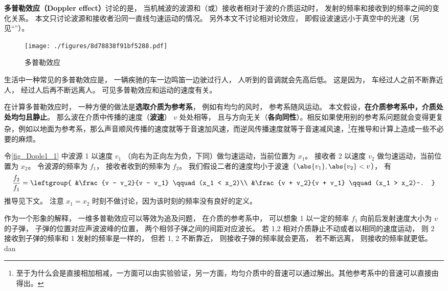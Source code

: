 

\textbf{多普勒效应（Doppler effect）}讨论的是， 当机械波的波源和（或）接收者相对于波的介质运动时， 发射的频率和接收到的频率之间的变化关系。 本文只讨论波源和接收者沿同一直线匀速运动的情况。 另外本文不讨论相对论效应， 即假设波速远小于真空中的光速（另见“”）。

\begin{figure}[ht]
\centering
\texttt{[image: ./figures/8d78838f91bf5288.pdf]}
\caption{多普勒效应} \label{fig_Dople1_1}
\end{figure}

\begin{example}{}
生活中一种常见的多普勒效应是， 一辆疾驰的车一边鸣笛一边驶过行人， 人听到的音调就会先高后低。 这是因为， 车经过人之前不断靠近人， 经过人后再不断远离人。 可见多普勒效应和运动的速度有关。
\end{example}

在计算多普勒效应时， 一种方便的做法是\textbf{选取介质为参考系}， 例如有均匀的风时， 参考系随风运动。 本文假设，\textbf{在介质参考系中，介质处处均匀且静止}。 那么波在介质中传播的速度（\textbf{波速}） $v$ 处处相等， 且与方向无关（\textbf{各向同性}）。相反如果使用别的参考系问题就会变得更复杂，例如以地面为参考系，那么声音顺风传播的速度就等于音速加风速，而逆风传播速度就等于音速减风速，\footnote{至于为什么会是直接相加相减，一方面可以由实验验证，另一方面，均匀介质中的音速可以通过解出。其他参考系中的音速可以直接由得出。}在推导和计算上造成一些不必要的麻烦。

令\autoref{fig_Dople1_1} 中波源 1 以速度 $v_1$ （向右为正向左为负，下同）做匀速运动，当前位置为 $x_1$。 接收者 2 以速度 $v_2$ 做匀速运动，当前位置为 $x_2$。 令波源的频率为 $f_1$， 接收者收到的频率为 $f_2$。 我们假设二者的速度均小于波速（$\abs{v_1}, \abs{v_2} < v$）， 有
\begin{equation}\label{eq_Dople1_1}
\frac{f_2}{f_1} = \leftgroup{
&\frac{v - v_2}{v - v_1} \qquad (x_1 < x_2)\\
&\frac{v + v_2}{v + v_1} \qquad (x_1 > x_2)~.
}\end{equation}
推导见下文。 注意 $x_1=x_2$ 时刻不做讨论，因为该时刻的频率没有良好的定义。

作为一个形象的解释， 一维多普勒效应可以等效为追及问题， 在介质的参考系中， 可以想象 1 以一定的频率 $f_1$ 向前后发射速度大小为 $v$ 的子弹， 子弹的位置对应声波波峰的位置， 两个相邻子弹之间的间距对应波长。 若 1,2 相对介质静止不动或者以相同的速度运动， 则 2 接收到子弹的频率和 1 发射的频率是一样的， 但若 1, 2 不断靠近， 则接收子弹的频率就会更高， 若不断远离， 则接收的频率就更低。 dan

